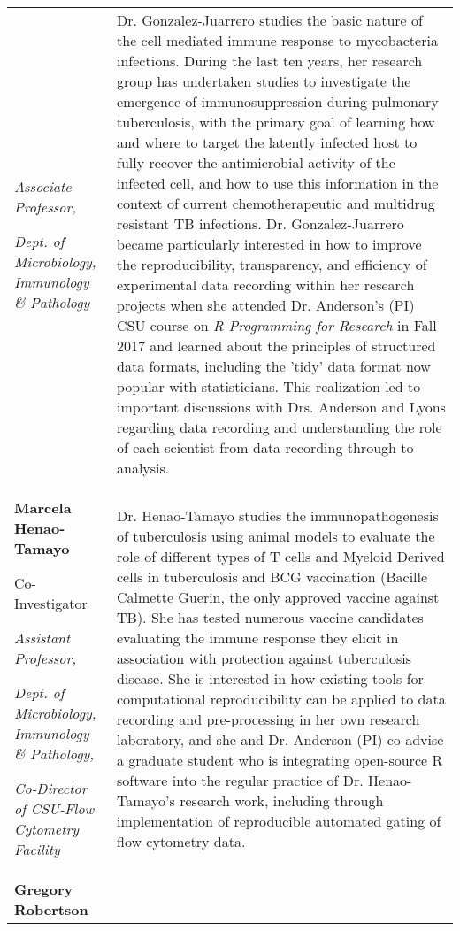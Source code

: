 \begin{table}[!h]
\begin{tabular}[t]{>{\raggedright\arraybackslash}p{14em}>{\raggedright\arraybackslash}p{45em}}
  \textit{Associate Professor,}
  
  \textit{Dept. of Microbiology, Immunology \& Pathology} & Dr. Gonzalez-Juarrero studies the basic nature of the
  cell mediated immune response to mycobacteria infections. During the last ten
  years, her research group has undertaken studies to investigate the emergence of
  immunosuppression during pulmonary tuberculosis, with the primary goal of
  learning how and where to target the latently infected host to fully recover the
  antimicrobial activity of the infected cell, and how to use this information in
  the context of current chemotherapeutic and multidrug resistant TB infections.
  Dr. Gonzalez-Juarrero became particularly interested in how to improve the
  reproducibility, transparency, and efficiency of experimental data recording
  within her research projects when she attended Dr. Anderson's (PI) CSU course on
  \textit{R Programming for Research} in Fall 2017 and learned about the
  principles of structured data formats, including the 'tidy' data format now
  popular with statisticians. This realization led to important discussions with
  Drs. Anderson and Lyons regarding data recording and understanding the role of
  each scientist from data recording through to analysis.\\
\textbf{Marcela Henao-Tamayo}
  
  Co-Investigator
  
  \textit{Assistant Professor,}
  
  \textit{Dept. of Microbiology, Immunology \& Pathology,}
  
  \textit{Co-Director of CSU-Flow Cytometry Facility} & Dr. Henao-Tamayo studies the immunopathogenesis of
  tuberculosis using animal models to evaluate the role of different types of T
  cells and Myeloid Derived cells in tuberculosis and BCG vaccination (Bacille
  Calmette Guerin, the only approved vaccine against TB). She has tested numerous
  vaccine candidates evaluating the immune response they elicit in association
  with protection against tuberculosis disease. She is interested in how existing
  tools for computational reproducibility can be applied to data recording and
  pre-processing in her own research laboratory, and she and Dr. Anderson (PI)
  co-advise a graduate student who is integrating open-source R software into the
  regular practice of Dr. Henao-Tamayo's research work, including through
  implementation of reproducible automated gating of flow cytometry data.\\
\textbf{Gregory Robertson}
  

\end{tabular}
\end{table}
